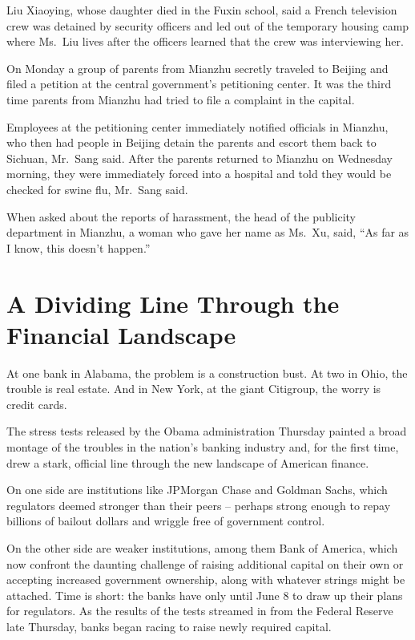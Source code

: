 \documentclass[12pt,a4paper,onecolumn]{article}
\begin{document}
Liu Xiaoying, whose daughter died in the Fuxin school, said a French television crew was detained by
security officers and led out of the temporary housing camp where Ms.~Liu lives after the officers
learned that the crew was interviewing her.

On Monday a group of parents from Mianzhu secretly traveled to Beijing and filed a petition at the
central government's petitioning center. It was the third time parents from Mianzhu had tried to
file a complaint in the capital.

Employees at the petitioning center immediately notified officials in Mianzhu, who then had people
in Beijing detain the parents and escort them back to Sichuan, Mr.~Sang said. After the parents
returned to Mianzhu on Wednesday morning, they were immediately forced into a hospital and told they
would be checked for swine flu, Mr.~Sang said.

When asked about the reports of harassment, the head of the publicity department in Mianzhu, a woman
who gave her name as Ms.~Xu, said, ``As far as I know, this doesn't happen.''

\section{A Dividing Line Through the Financial Landscape}

At one bank in Alabama, the problem is a construction bust. At two in Ohio, the trouble is real
estate. And in New York, at the giant Citigroup, the worry is credit cards.

The stress tests released by the Obama administration Thursday painted a broad montage of the
troubles in the nation's banking industry and, for the first time, drew a stark, official line
through the new landscape of American finance.

On one side are institutions like JPMorgan Chase and Goldman Sachs, which regulators deemed stronger
than their peers -- perhaps strong enough to repay billions of bailout dollars and wriggle free of
government control.

On the other side are weaker institutions, among them Bank of America, which now confront the
daunting challenge of raising additional capital on their own or accepting increased government
ownership, along with whatever strings might be attached. Time is short: the banks have only until
June 8 to draw up their plans for regulators. As the results of the tests streamed in from the
Federal Reserve late Thursday, banks began racing to raise newly required capital.
\end{document}
